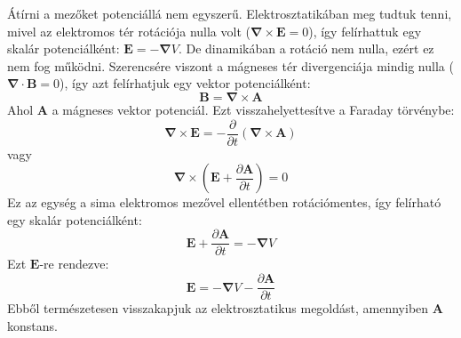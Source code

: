 \documentclass[../main.tex]{subfiles}
\begin{document}
Átírni a mezőket potenciállá nem egyszerű. Elektrosztatikában meg tudtuk tenni, mivel az elektromos tér rotációja nulla volt ($\boldsymbol{\nabla} \times \mathbf{E} = 0$), így felírhattuk egy skalár potenciálként: $\mathbf{E} = - \boldsymbol{\nabla} V$.
De dinamikában a rotáció nem nulla, ezért ez nem fog működni. Szerencsére viszont a mágneses tér divergenciája mindig nulla ($\boldsymbol{\nabla} \cdot \mathbf{B} = 0$), így azt felírhatjuk egy vektor potenciálként:
\begin{equation}
    \mathbf{B} = \boldsymbol{\nabla} \times \mathbf{A}
\end{equation}
Ahol $\mathbf{A}$ a mágneses vektor potenciál. Ezt visszahelyettesítve a Faraday törvénybe:
\begin{equation}
    \boldsymbol{\nabla} \times \mathbf{E} = - \frac{\partial }{\partial t} (\boldsymbol{\nabla} \times \mathbf{A})
\end{equation}
vagy
\begin{equation}
    \boldsymbol{\nabla} \times \left( \mathbf{E} + \frac{\partial \mathbf{A}}{\partial t} \right) = 0
\end{equation}
Ez az egység a sima elektromos mezővel ellentétben rotációmentes, így felírható egy skalár potenciálként:
\begin{equation}
    \mathbf{E} + \frac{\partial \mathbf{A}}{\partial t} = - \boldsymbol{\nabla} V
\end{equation}
Ezt $\mathbf{E}$-re rendezve:
\begin{equation}
    \boxed{\mathbf{E} = - \boldsymbol{\nabla} V - \frac{\partial \mathbf{A}}{\partial t}}
\end{equation}
Ebből természetesen visszakapjuk az elektrosztatikus megoldást, amennyiben $\mathbf{A}$ konstans.
\end{document}
